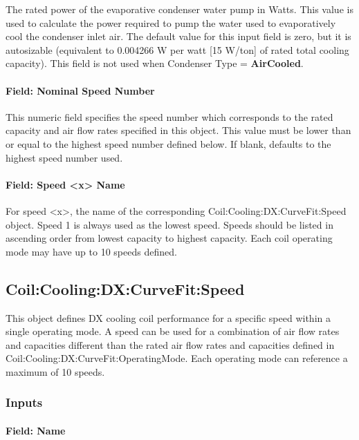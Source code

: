 The rated power of the evaporative condenser water pump in Watts. This value is used to calculate the power required to pump the water used to evaporatively cool the condenser inlet air. The default value for this input field is zero, but it is autosizable (equivalent to 0.004266 W per watt {[}15 W/ton{]} of rated total cooling capacity). This field is not used when Condenser Type = \textbf{AirCooled}.

\paragraph{Field: Nominal Speed Number}\label{field-nominal-speed-number}

This numeric field specifies the speed number which corresponds to the rated capacity and air flow rates specified in this object. This value must be lower than or equal to the highest speed number defined below. If blank, defaults to the highest speed number used.

\paragraph{Field: Speed \textless{}x\textgreater{} Name}\label{field-speed-x-name}

For speed \textless{}x\textgreater{}, the name of the corresponding Coil:Cooling:DX:CurveFit:Speed object. Speed 1 is always used as the lowest speed. Speeds should be listed in ascending order from lowest capacity to highest capacity. Each coil operating mode may have up to 10 speeds defined.

\subsection{Coil:Cooling:DX:CurveFit:Speed}\label{coilcoolingdxcurvefitspeed}

This object defines DX cooling coil performance for a specific speed within a single operating mode. A speed can be used for a combination of air flow rates and capacities different than the rated air flow rates and capacities defined in Coil:Cooling:DX:CurveFit:OperatingMode. Each operating mode can reference a maximum of 10 speeds.

\subsubsection{Inputs}\label{inputs-04}

\paragraph{Field: Name}\label{field-name-04}

